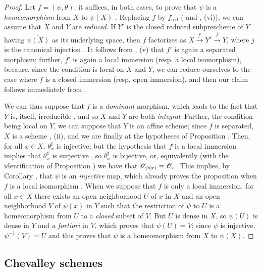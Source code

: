 \begin{proof}
\label{proof-1.8.2.8}
Let $f=(\psi,\theta)$; it suffices, in both cases, to prove that $\psi$ is a
\emph{homeomorphism} from $X$ to $\psi(X)$ . Replacing $f$ by
$f_\text{red}$ ( and , (vi)), we can assume that $X$
and $Y$ are \emph{reduced}. If $Y'$ is the closed reduced subprescheme of $Y$
having $\overline{\psi(X)}$ as its underlying space, then $f$ factorizes as
$X\xrightarrow{f'}Y'\xrightarrow{j}Y$, where $j$ is the canonical injection
. It follows from , (v) that $f'$ is again a
separated morphism; further, $f'$ is again
a local immersion (resp. a local isomorphism), because, since the condition is local on $X$
and $Y$, we can reduce ourselves to the case where $f$ is a closed immersion (resp. open
immersion), and then our claim follows immediately from .

We can thus suppose that $f$ is a \emph{dominant} morphism, which leads to the
fact that $Y$ is, itself, irreducible , and so $X$ and $Y$
are both \emph{integral}. Further, the condition being local on $Y$, we can
suppose that $Y$ is an affine scheme; since $f$ is separated, $X$ is a scheme
, (ii), and we are finally at the hypotheses of Proposition .
Then, for all $x\in X$, $\theta_x^\sharp$ is injective; but the hypothesis that $f$
is a local immersion implies that $\theta_x^\sharp$ is surjective , so
$\theta_x^\sharp$ is bijective, or, equivalently (with the identification of Proposition
) we have that $\mathscr{O}_{\psi(x)}=\mathscr{O}_x$. This implies, by
Corollary ,
that $\psi$ is an \emph{injective} map, which already proves the proposition
when $f$ is a local isomorphism . When we suppose that $f$ is only
a local immersion, for all $x\in X$ there exists an open neighborhood $U$ of
$x$ in $X$ and an open neighborhood $V$ of $\psi(x)$ in $Y$ such that the
restriction of $\psi$ to $U$ is a homeomorphism from $U$ to a \emph{closed}
subset of $V$. But $U$ is dense in $X$, so $\psi(U)$ is dense in $Y$ and
\emph{a fortiori} in $V$, which proves that $\psi(U)=V$; since $\psi$ is
injective, $\psi^{-1}(V)=U$ and this proves that $\psi$ is a homeomorphism from
$X$ to $\psi(X)$.
\end{proof}

\subsection{Chevalley schemes}
\label{subsection-chevalley-schemes}


